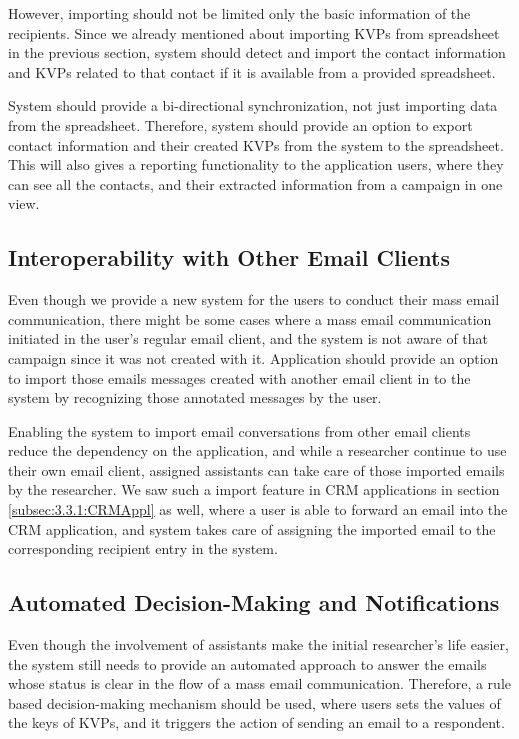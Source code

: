 However, importing should not be limited only the basic information of the recipients. Since we already mentioned about importing \ac{KVP}s from spreadsheet in the previous section, system should detect and import the contact information and \ac{KVP}s related to that contact if it is available from a provided spreadsheet. 
\vspace{1cm}

System should provide a bi-directional synchronization, not just importing data from the spreadsheet. Therefore, system should provide an option to export contact information and their created \ac{KVP}s from the system to the spreadsheet. This will also gives a reporting functionality to the application users, where they can see all the contacts, and their extracted information from a campaign in one view.

\subsection{Interoperability with Other Email Clients}
\label{subsec:5.1.4:InteEmaiClie}
Even though we provide a new system for the users to conduct their mass email communication, there might be some cases where a mass email communication initiated in the user's regular email client, and the system is not aware of that campaign since it was not created with it. Application should provide an option to import those emails messages created with another email client in to the system by recognizing those annotated messages by the user.
\vspace{1cm}

Enabling the system to import email conversations from other email clients reduce the dependency on the application, and while a researcher continue to use their own email client, assigned assistants can take care of those imported emails by the researcher. We saw such a import feature in \ac{CRM} applications in section \ref{subsec:3.3.1:CRMAppl} as well, where a user is able to forward an email into the \ac{CRM} application, and system takes care of assigning the imported email to the corresponding recipient entry in the system.

\subsection{Automated Decision-Making and Notifications}
\label{subsec:5.1.5:AutoDeciMakiNoti}
Even though the involvement of assistants make the initial researcher's life easier, the system still needs to provide an automated approach to answer the emails whose status is clear in the flow of a mass email communication. Therefore, a rule based decision-making mechanism should be used, where users sets the values of the keys of \ac{KVP}s, and it triggers the action of sending an email to a respondent.
\vspace{1cm}

